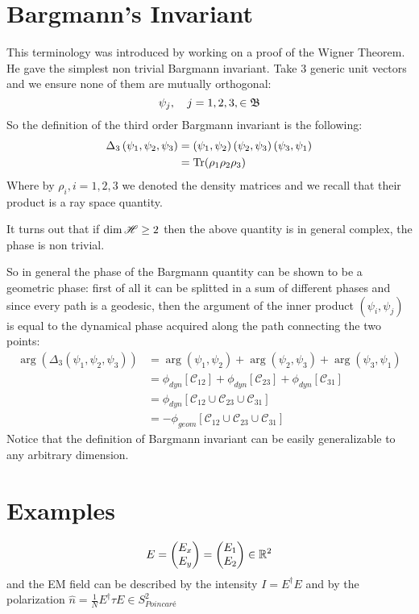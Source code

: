 \section{Bargmann's Invariant}
This terminology was introduced by \cite{bargmann1964note} working on a proof of the Wigner Theorem. He gave the simplest non trivial Bargmann invariant. Take 3 generic unit vectors and we ensure none of them are mutually orthogonal:
\begin{equation}
\psi_{j},\quad j=1,2,3, \in \mathfrak{B}
\end{equation}
So the definition of the third order Bargmann invariant is the following:
\begin{align}
\Delta_3\left(\psi_1,\psi_2,\psi_3\right)&=\left(\psi_1,\psi_2\right)\left(\psi_2,\psi_3\right)\left(\psi_3,\psi_1\right)\\
&=\mathrm{Tr}(\rho_1\rho_2\rho_3)
\end{align}
Where by $ \rho_i, i=1,2,3 $ we denoted the density matrices and we recall that their product is a ray space quantity.

It turns out that if $ \dim\mathscr{H}\geq2 $ then the above quantity is in general complex, the phase is non trivial.

So in general the phase of the Bargmann quantity can be shown to be a geometric phase: first of all it can be splitted in a sum of different phases and since every path is a geodesic, then the argument of the inner product $ \left(\psi_i,\psi_j\right) $ is equal to the dynamical phase acquired along the path connecting the two points:
\begin{align}
	\arg(\Delta_3\left(\psi_1,\psi_2,\psi_3\right))&=\arg(\psi_1,\psi_2)+\arg(\psi_2,\psi_3)+\arg(\psi_3,\psi_1)\\
	&=\phi_{dyn}\left[\mathcal{C}_{12}\right]+\phi_{dyn}\left[\mathcal{C}_{23}\right]+\phi_{dyn}\left[\mathcal{C}_{31}\right]\\
	&=\phi_{dyn}\left[\mathcal{C}_{12}\cup\mathcal{C}_{23}\cup\mathcal{C}_{31} \right]\\
	&=-\phi_{geom}\left[\mathcal{C}_{12}\cup\mathcal{C}_{23}\cup\mathcal{C}_{31} \right]
\end{align}
Notice that the definition of Bargmann invariant can be easily generalizable to any arbitrary dimension.
\section{Examples}
\begin{equation}
E=
\begin{pmatrix}
E_x\\
E_y
\end{pmatrix}
=
\begin{pmatrix}
E_1\\
E_2
\end{pmatrix}
\in \mathbb{R}^2
\end{equation}
and the EM field can be described by the intensity $ I=E^{\dagger}E $ and by the polarization $ \hat{n}=\frac{1}{N}E^{\dagger}\tau E\in S_{Poincaré}^2 $